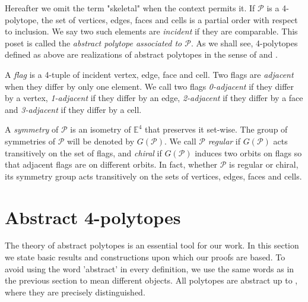 \documentclass{article}
\theoremstyle{definition}
\newcommand{\E}{\mathbb{E}}
\newcommand{\p}{\mathcal{P}}
\begin{document}
	Hereafter we omit the term "skeletal" when the context permits it. If $\p$ is a 4-polytope, the set of vertices, edges, faces and cells is a partial order with respect to inclusion. We say two such elements are \textit{incident} if they are comparable. This poset is called the \textit{abstract polytope associated to $\p$}. As we shall see, 4-polytopes defined as above are realizations of abstract polytopes in the sense of \cite{abstract-polytopes} and .
	
	A \textit{flag} is a 4-tuple of incident vertex, edge, face and cell. Two flags are \textit{adjacent} when they differ by only one element. We call two flags \textit{0-adjacent} if they differ by a vertex, \textit{1-adjacent} if they differ by an edge, \textit{2-adjacent} if they differ by a face and \textit{3-adjacent} if they differ by a cell.
	
	A \textit{symmetry} of $\p$ is an isometry of $\E^4$ that preserves it set-wise. The group of symmetries of $\p$ will be denoted by $G(\p)$. We call $\p$ \textit{regular} if $G(\p)$ acts transitively on the set of flags, and \textit{chiral} if $G(\p)$ induces two orbits on flags so that adjacent flags are on different orbits. In fact, whether $\p$ is regular or chiral, its symmetry group acts transitively on the sets of vertices, edges, faces and cells.
	

	
\section{Abstract 4-polytopes}\label{sec:abstract-defs}
	The theory of abstract polytopes is an essential tool for our work. In this section we state basic results and constructions upon which our proofs are based. To avoid using the word 'abstract' in every definition, we use the same words as in the previous section to mean different objects. All polytopes are abstract up to , where they are precisely distinguished.
	
\end{document}
